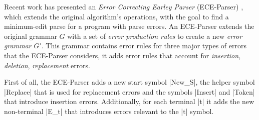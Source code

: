 Recent work has presented an \emph{Error
Correcting Earley Parser} (ECE-Parser) \citep{Aho_1972}, which extends the
original algorithm's operations, with the goal to find a minimum-edit parse for
a program with parse errors. An ECE-Parser extends the original grammar $G$ with
a set of \emph{error production rules} to create a new \emph{error grammar}
$G'$. This grammar contains error rules for three major types of errors that the
ECE-Parser considers, \ie it adds error rules that account for \emph{insertion},
\emph{deletion}, \emph{replacement} errors.

First of all, the ECE-Parser adds a new start symbol |New_S|, the helper symbol
|Replace| that is used for replacement errors and the symbols |Insert| and
|Token| that introduce insertion errors. Additionally, for each terminal |t| it
adds the new non-terminal |E_t| that introduces errors relevant to the |t|
symbol.

